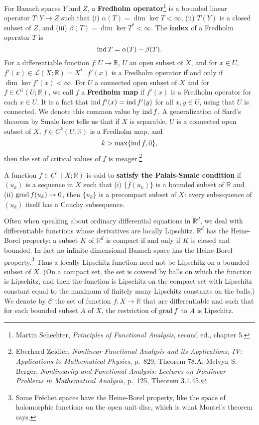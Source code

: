 \documentclass{article}
\newcommand{\grad}{\ensuremath\mathrm{grad}\,}
\newcommand{\ind}{\ensuremath\mathrm{ind}\,}
\theoremstyle{definition}
\begin{document}
For Banach spaces $Y$ and $Z$, a \textbf{Fredholm operator}\footnote{Martin Schechter, {\em Principles of Functional Analysis},
second ed., chapter 5.} is a bounded linear operator $T:Y \to Z$ such that (i) $\alpha(T) = \dim \ker T<\infty$, (ii) $T(Y)$ is a closed subset of $Z$,
and (iii)
$\beta(T) = \dim \ker T^*<\infty$. The \textbf{index} of a Fredholm operator $T$ is
\[
\ind T = \alpha(T) - \beta(T).
\]
For a differentiable function $f:U \to \mathbb{R}$, $U$ an open subset of $X$, and for $x \in U$,
$f'(x) \in \mathscr{L}(X;\mathbb{R})=X^*$. $f'(x)$ is a Fredholm operator if and only
if $\dim \ker f'(x) < \infty$. 
For $U$ a connected open subset of $X$ and for $f \in C^1(U;\mathbb{R})$, we call $f$ a \textbf{Fredholm map} if
$f'(x)$ is a Fredholm operator for each $x \in U$. It is a fact that $\ind f'(x) = \ind f'(y)$ for all $x,y \in U$, using that $U$ is connected.
We denote this common value by $\ind f$. 
A generalization of Sard's theorem by Smale here tells us that if $X$ is separable, $U$ is a connected
open subset of $X$,
$f \in C^k(U;\mathbb{R})$ is a Fredholm map, and 
\[
k > \max\{\ind f, 0\},
\]
then the set of critical values of $f$ is meager.\footnote{Eberhard Zeidler,
{\em Nonlinear Functional Analysis and its Applications, IV: Applications to Mathematical Physics}, p.~829, Theorem 78.A;
Melvyn S. Berger, {\em Nonlinearity and Functional Analysis: Lectures on Nonlinear Problems in Mathematical Analysis},
p.~125, Theorem 3.1.45.}


A function $f \in C^1(X;\mathbb{R})$ is said to \textbf{satisfy the Palais-Smale condition} if 
 $(u_k)$ is a sequence in $X$ such that (i) $\{f(u_k)\}$ is a bounded subset of $\mathbb{R}$ and (ii)
 $\grad f(u_k) \to 0$, then $\{u_k\}$ is a precompact subset of $X$: every subsequence of $(u_k)$ itself has a Cauchy subsequence. 

Often when speaking about ordinary differential equations in $\mathbb{R}^d$, we deal with differentiable functions whose derivatives
are locally Lipschitz.  $\mathbb{R}^d$ has the Heine-Borel property: a subset $K$ of $\mathbb{R}^d$ is compact if and only if $K$ is closed
and bounded.  In fact no infinite dimensional Banach space has the Heine-Borel property.\footnote{Some Fr\'echet spaces have the Heine-Borel property, like the space
of holomorphic functions on the open unit disc, which is what Montel's theorem says.}
Thus a locally Lipschitz function need not be Lipschitz on a bounded subset of $X$. (On a compact set, the set is covered by balls on which the function is Lipschitz,
and then the function is Lipschitz on the compact set with Lipschitz constant equal to the maximum of finitely many Lipschitz constants on the balls.)
We denote by $\mathcal{C}$ the set of function $f:X \to \mathbb{R}$ that are differentiable and such that for each bounded subset $A$ of $X$, 
the restriction of $\grad f$ to $A$ is Lipschitz.
\end{document}
